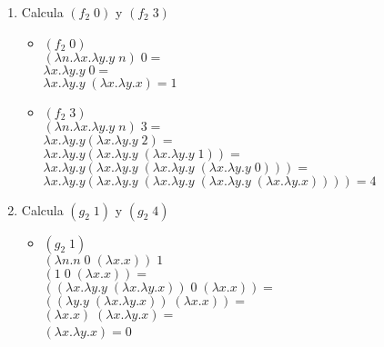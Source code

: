 \documentclass[11pt, a4paper]{report}
\begin{document}
  \begin{enumerate}[label=\alph*)]
	\item Calcula $(f_{2}\;0)$ y $(f_{2}\;3)$
    \begin{itemize}
    \item $(f_{2}\;0)$ \\
    $(\lambda n. \lambda x. \lambda y. y\; n)\;0=$\\
    $\lambda x. \lambda y. y\;0=$\\
    $\lambda x. \lambda y. y\;(\lambda x.\lambda y. x)=1$\\
    
    \item $(f_{2}\;3)$ \\
    $(\lambda n. \lambda x. \lambda y. y\; n)\;3=$\\
    $\lambda x. \lambda y. y (\lambda x. \lambda y. y\; 2)=$\\
    $\lambda x. \lambda y. y (\lambda x. \lambda y. y\; (\lambda x. \lambda y. y\; 1))=$\\
    $\lambda x. \lambda y. y (\lambda x. \lambda y. y\; 
    (\lambda x. \lambda y. y\; (\lambda x. \lambda y. y\; 0)))=$\\
    $\lambda x. \lambda y. y (\lambda x. \lambda y. y\; 
    (\lambda x. \lambda y. y\; (\lambda x. \lambda y. y\; (\lambda x. \lambda y.x))))= 4$\\
    
    \end{itemize}
	\item Calcula $(g_{2}\; 1)$ y $(g_{2}\; 4)$
    \begin{itemize}
    \item $(g_{2}\; 1)$\\
    $(\lambda n. n\; 0\; (\lambda x. x))\;1$\\
    $(1\;0\;(\lambda x. x))=$\\
    $((\lambda x. \lambda y. y\; (\lambda x. \lambda y.x))\;0\;(\lambda x. x))=$\\
    $((\lambda y. y\; (\lambda x. \lambda y.x))\;(\lambda x. x))=$\\
    $(\lambda x. x)\; (\lambda x. \lambda y.x)=$\\
    $(\lambda x. \lambda y.x)= 0$\
    

\end{itemize}
\end{enumerate}
\end{document}
